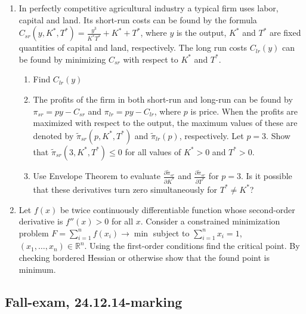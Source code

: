 \documentclass[12pt]{article} %
\theoremstyle{definition} %
\begin{document}
\begin{enumerate}[resume]
\item In perfectly competitive agricultural industry a typical firm uses labor, capital and land. Its short-run costs can be found by the formula $C_{sr}(y,K^*,T^*)=\frac{y^3}{K^*T^*}+K^*+T^*$, where $y$  is the output, $K^*$  and $T^*$  are fixed quantities of capital and land, respectively.
The long run costs $C_{lr}(y)$ can be found by minimizing $C_{sr}$ with respect to $K^*$  and $T^*$.
\begin{enumerate}
\item Find  $C_{lr}(y)$
\item The profits of the firm in both short-run and long-run can be found by $\pi_{sr}=py-C_{sr}$  and   $\pi_{lr}=py-C_{lr}$, where $p$ is price. When the profits are maximized with respect to the output, the maximum values of these are denoted by $\tilde{\pi}_{sr}(p,K^*,T^*)$ and $\tilde{\pi}_{lr}(p)$, respectively. Let $p=3$. Show that $\tilde{\pi}_{sr}(3,K^*,T^*) \leq 0$ for all values of  $K^*>0$  and  $T^*>0$.
\item Use Envelope Theorem to evaluate $\frac{\partial \tilde{\pi}_{sr}}{\partial K^*}$ and $\frac{\partial \tilde{\pi}_{sr}}{\partial T^*}$ for $p=3$. Is it possible that these derivatives turn zero simultaneously for $T^* \neq K^*$?
\end{enumerate}

\item Let $f(x)$ be twice continuously differentiable function whose second-order derivative is $f''(x)>0$ for all $x$. Consider a constrained minimization problem $F=\sum_{i=1}^n f(x_i) \to \min$
subject to $\sum_{i=1}^n x_i = 1$,  $(x_1, \ldots, x_n)\in \mathbb{R}^n$. Using the first-order conditions find the critical point. By checking bordered Hessian or otherwise show that the found point is minimum.
\end{enumerate}

\subsection{Fall-exam, 24.12.14-marking}
\end{document}
